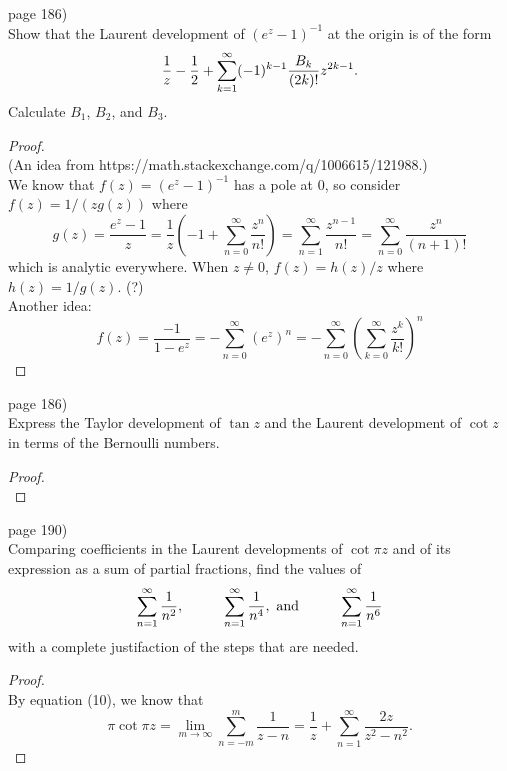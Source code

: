 \documentclass{article}
\newenvironment{problem}[2][Problem]{\begin{trivlist}
\item[\hskip \labelsep {\bfseries #1}\hskip \labelsep {\bfseries #2.}]}{\end{trivlist}}
\begin{document}
\begin{problem}{4} (page 186) \\
  Show that the Laurent development of $(e^z - 1)^{-1}$ at the origin is of the
  form \[
    \frac{1}{z} - \frac{1}{2} +
    \sum\displaylimits_{k = 1}^\infty (-1)^{k-1}\frac{B_k}{(2k)!}z^{2k-1}.
  \]
  Calculate $B_1$, $B_2$, and $B_3$.
\end{problem}
\begin{proof} \text{} \\
  (An idea from https://math.stackexchange.com/q/1006615/121988.)\\
  We know that $f(z) = (e^z - 1)^{-1}$ has a pole at 0, so consider
  $f(z) = 1/(zg(z))$ where \[
    g(z) = \frac{e^{z} - 1}{z}
         = \frac{1}{z}\left(-1 + \sum_{n=0}^\infty \frac{z^n}{n!}\right)
         = \sum_{n=1}^\infty \frac{z^{n-1}}{n!}
         = \sum_{n=0}^\infty \frac{z^n}{(n + 1)!}
  \] which is analytic everywhere. When $z \not= 0$, $f(z) = h(z)/z$ where
  $h(z) = 1/g(z)$.
  (?)\\
  Another idea: \[
    f(z) = \frac{-1}{1 - e^z} = -\sum_{n=0}^\infty (e^z)^n = -\sum_{n=0}^\infty \left(\sum_{k=0}^\infty\frac{z^k}{k!}\right)^n
  \]
\end{proof}
\pagebreak


\begin{problem}{5} (page 186) \\
  Express the Taylor development of $\tan z$ and the Laurent development of
  $\cot z$ in terms of the Bernoulli numbers.
\end{problem}
\begin{proof} \text{} \\
\end{proof}
\pagebreak


\begin{problem}{1} (page 190) \\
  Comparing coefficients in the Laurent developments of $\cot\pi z$ and of its
  expression as a sum of partial fractions, find the values of \[
    \sum\displaylimits_{n = 1}^\infty \frac{1}{n^2},
    \hspace{1cm}
    \sum\displaylimits_{n = 1}^\infty \frac{1}{n^4}, \text{ and}
    \hspace{1cm}
    \sum\displaylimits_{n = 1}^\infty \frac{1}{n^6}
  \] with a complete justifaction of the steps that are needed.
\end{problem}
\begin{proof} \text{} \\
  By equation (10), we know that \[
    \pi\cot\pi z = \lim_{m\rightarrow\infty}\sum_{n = -m}^{m} \frac { 1} { z - n } = \frac { 1} { z } + \sum _ { n = 1} ^ { \infty } \frac { 2z } { z ^ { 2} - n ^ { 2} }.
  \]
\end{proof}
\pagebreak
\end{document}
